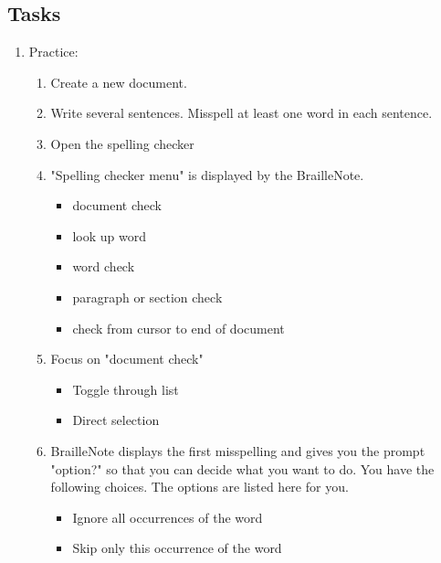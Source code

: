 \documentclass[10pt,letterpaper,twoside]{report}
\begin{document}
{\subsection{Tasks}
\begin{enumerate}
	\item Practice:
	      \begin{enumerate}
		      \item Create a new document.
		      \item Write several sentences. Misspell at least one word in each sentence.
		      \item Open the spelling checker 
		      \item "Spelling checker menu" is displayed by the BrailleNote.
		            \begin{itemize}
			            \item document check
			            \item look up word
			            \item word check
			            \item paragraph or section check
			            \item check from cursor to end of document
		            \end{itemize}
		      \item Focus on "document check"
		            \begin{itemize}
			            \item Toggle through list 
			            \item Direct selection 
		            \end{itemize}
		      \item BrailleNote displays the first misspelling and gives you the prompt "option?" so that you can decide what you want to do. You have the following choices. The options are listed here for you.
		            \begin{itemize}
			            \item Ignore all occurrences of the word 
			            \item Skip only this occurrence of the word 

\end{itemize}
\end{enumerate}
\end{enumerate}}
\end{document}
